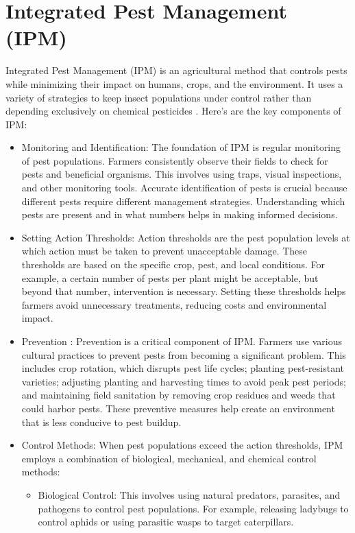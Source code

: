 \section{Integrated Pest Management (IPM)}
Integrated Pest Management (IPM) is an agricultural method that controls pests while minimizing their impact on humans, crops, and the environment. It uses a variety of strategies to keep insect populations under control rather than depending exclusively on chemical pesticides \cite{usepa_2014_managing}. Here’s are the key components of IPM:
\begin{itemize}
    \item Monitoring and Identification: The foundation of IPM is regular monitoring of pest populations. Farmers consistently observe their fields to check for pests and beneficial organisms. This involves using traps, visual inspections, and other monitoring tools. Accurate identification of pests is crucial because different pests require different management strategies. Understanding which pests are present and in what numbers helps in making informed decisions.
    \item Setting Action Thresholds: Action thresholds are the pest population levels at which action must be taken to prevent unacceptable damage. These thresholds are based on the specific crop, pest, and local conditions. For example, a certain number of pests per plant might be acceptable, but beyond that number, intervention is necessary. Setting these thresholds helps farmers avoid unnecessary treatments, reducing costs and environmental impact.
    \item Prevention : Prevention is a critical component of IPM. Farmers use various cultural practices to prevent pests from becoming a significant problem. This includes crop rotation, which disrupts pest life cycles; planting pest-resistant varieties; adjusting planting and harvesting times to avoid peak pest periods; and maintaining field sanitation by removing crop residues and weeds that could harbor pests. These preventive measures help create an environment that is less conducive to pest buildup.
    \item Control Methods: When pest populations exceed the action thresholds, IPM employs a combination of biological, mechanical, and chemical control methods:
    \begin{itemize}
        \item Biological Control: This involves using natural predators, parasites, and pathogens to control pest populations. For example, releasing ladybugs to control aphids or using parasitic wasps to target caterpillars.

\end{itemize}
\end{itemize}
